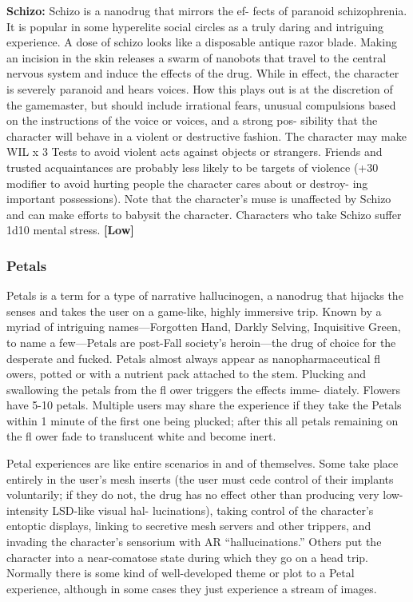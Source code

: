 \textbf{Schizo:} Schizo is a nanodrug that mirrors the ef-
fects of paranoid schizophrenia. It is popular in 
some hyperelite social circles as a truly daring and 
intriguing experience. A dose of schizo looks like a 
disposable antique razor blade. Making an incision 
in the skin releases a swarm of nanobots that travel 
to the central nervous system and induce the effects 
of the drug. While in effect, the character is severely 
paranoid and hears voices. How this plays out is at 
the discretion of the gamemaster, but should include 
irrational fears, unusual compulsions based on the 
instructions of the voice or voices, and a strong pos-
sibility that the character will behave in a violent or 
destructive fashion. The character may make WIL x 3 
Tests to avoid violent acts against objects or strangers. 
Friends and trusted acquaintances are probably less 
likely to be targets of violence (+30 modifier to avoid 
hurting people the character cares about or destroy-
ing important possessions). Note that the character's 
muse is unaffected by Schizo and can make efforts 
to babysit the character. Characters who take Schizo 
suffer 1d10 mental stress. \textbf{[Low]}

\subsubsection{Petals}

Petals is a term for a type of narrative hallucinogen, 
a nanodrug that hijacks the senses and takes the user 
on a game-like, highly immersive trip. Known by a 
myriad of intriguing names—Forgotten Hand, Darkly 
Selving, Inquisitive Green, to name a few—Petals are 
post-Fall society's heroin—the drug of choice for the 
desperate and fucked. Petals almost always appear as 
nanopharmaceutical fl owers, potted or with a nutrient 
pack attached to the stem. Plucking and swallowing 
the petals from the fl ower triggers the effects imme-
diately. Flowers have 5-10 petals. Multiple users may 
share the experience if they take the Petals within 1 
minute of the first one being plucked; after this all 
petals remaining on the fl ower fade to translucent 
white and become inert.

Petal experiences are like entire scenarios in and of 
themselves. Some take place entirely in the user's mesh 
inserts (the user must cede control of their implants 
voluntarily; if they do not, the drug has no effect other 
than producing very low-intensity LSD-like visual hal-
lucinations), taking control of the character's entoptic 
displays, linking to secretive mesh servers and other 
trippers, and invading the character's sensorium with 
AR ``hallucinations.'' Others put the character into a 
near-comatose state during which they go on a head 
trip. Normally there is some kind of well-developed 
theme or plot to a Petal experience, although in some 
cases they just experience a stream of images.

